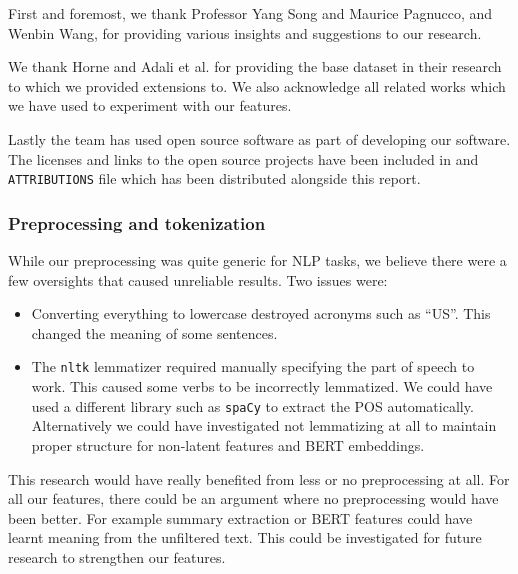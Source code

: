 \documentclass{article}
\begin{document}


First and foremost, we thank Professor Yang Song and Maurice Pagnucco, and Wenbin Wang, for providing various insights and suggestions to our research.

We thank Horne and Adali et al. for providing the base dataset in their research~\cite{horne2017} to which we provided extensions to. We also acknowledge all related works which we have used to experiment with our features.

Lastly the team has used open source software as part of developing our software. The licenses and links to the open source projects have been included in and \verb|ATTRIBUTIONS| file which has been distributed alongside this report.


\subsubsection*{Preprocessing and tokenization}\label{limitation:preprocessing}

While our preprocessing was quite generic for NLP tasks, we believe there were a few oversights that caused unreliable results. Two issues were:
\begin{itemize}
  \item Converting everything to lowercase destroyed acronyms such as ``US''. This changed the meaning of some sentences.
  \item The \verb|nltk| lemmatizer required manually specifying the part of speech to work. This caused some verbs to be incorrectly lemmatized. We could have used a different library such as \verb|spaCy| to extract the POS automatically. Alternatively we could have investigated not lemmatizing at all to maintain proper structure for non-latent features and BERT embeddings.
\end{itemize}

This research would have really benefited from less or no preprocessing at all. For all our features, there could be an argument where no preprocessing would have been better. For example summary extraction or BERT features could have learnt meaning from the unfiltered text. This could be investigated for future research to strengthen our features.
\end{document}
